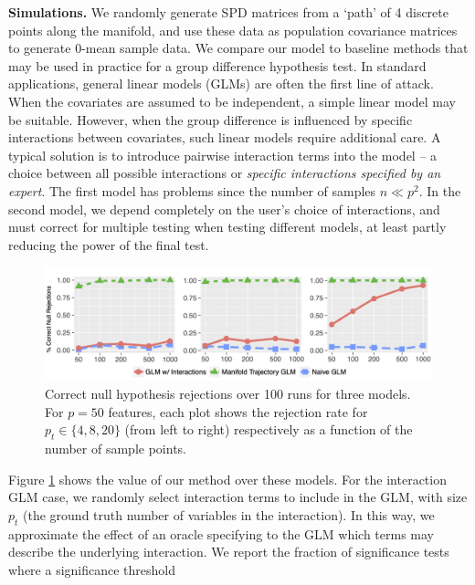 \textbf{Simulations.} We randomly generate SPD matrices from a `path' of 4 discrete points along the manifold, and use these data 
as population 
covariance matrices to generate 0-mean sample data. 
We compare our model to baseline methods that may be used in practice for a
group difference hypothesis test. In standard applications, general linear models (GLMs) are often the first line of attack. 
When the covariates are assumed to be independent, a simple linear model may be suitable. 
However, when the group difference is influenced by specific interactions between covariates, such linear models require additional care. 
A typical solution is to introduce pairwise interaction terms into the model -- a choice between 
all possible interactions or \textit{specific interactions specified by an expert}. The first model has 
problems since the number of samples $n \ll p^2$. In the second model, we depend completely on the user's choice of interactions, 
and must correct for multiple testing when testing different models, at least partly reducing the power of the final test.
%
\begin{figure}
	\begin{center}
		\includegraphics[width=\textwidth]{chap2/sim_results.png}
		\caption{\label{fg:sim_graphs}{\footnotesize Correct null hypothesis rejections over 100 runs for three models. For $p = 50$ features, each plot shows the rejection rate
				for $p_t \in \{4, 8, 20\}$ (from left to right) respectively as a function of the number of sample points.} }
	\end{center}
\end{figure}
%	
Figure \ref{fg:sim_graphs} shows the value of our method over these models. For the interaction GLM case, we randomly select interaction terms to include in the GLM, with size $p_t$ (the ground truth number of variables in the interaction). In this way, we approximate the effect of an oracle specifying to the GLM which terms may describe the underlying interaction. 
We report the fraction of significance tests where a significance threshold 
